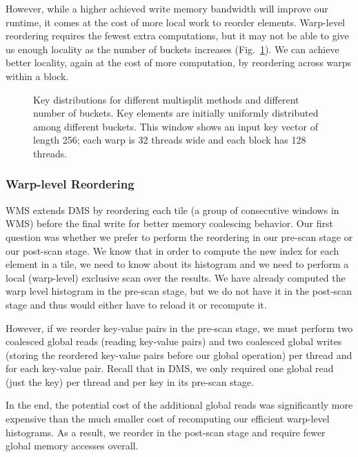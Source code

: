 However, while a higher achieved write memory bandwidth will improve our runtime, it comes at the cost of more local work to reorder elements. Warp-level reordering requires the fewest extra computations, but it may not be able to give us enough locality as the number of buckets increases (Fig.~\ref{fig:dist}). We can achieve better locality, again at the cost of more computation, by reordering across warps within a block.
\begin{figure}
\centering
{}
\caption{Key distributions for different multisplit methods and different number of buckets. Key elements are initially uniformly distributed among different buckets. This window shows an input key vector of length 256; each warp is 32 threads wide and each block has 128 threads. }\label{fig:dist}
\end{figure}

\subsubsection{Warp-level Reordering}\label{subsubsec:warp_reordering}
WMS extends DMS by reordering each tile (a group of consecutive windows in WMS) before the final write for better memory coalescing behavior.
Our first question was whether we prefer to perform the reordering in our pre-scan stage or our post-scan stage. We know that in order to compute the new index for each element in a tile, we need to know about its histogram and we need to perform a local (warp-level) exclusive scan over the results. We have already computed the warp level histogram in the pre-scan stage, but we do not have it in the post-scan stage and thus would either have to reload it or recompute it.

However, if we reorder key-value pairs in the pre-scan stage, we must perform two coalesced global reads (reading key-value pairs) and two coalesced global writes (storing the reordered key-value pairs before our global operation) per thread and for each key-value pair. Recall that in DMS, we only required one global read (just the key) per thread and per key in its pre-scan stage.

In the end, the potential cost of the additional global reads was significantly more expensive than the much smaller cost of recomputing our efficient warp-level histograms. As a result, we reorder in the post-scan stage and require fewer global memory accesses overall.

